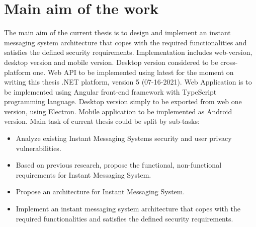 \chapter{Main aim of the work}\label{ch:main-aim-of-the-work}

The main aim of the current thesis is to design and implement an instant messaging system architecture that copes with the required functionalities and
satisfies the defined security requirements.
Implementation includes web-version, desktop version and mobile version.
Desktop version considered to be cross-platform one.
Web API to be implemented using latest for the moment on writing this thesis .NET platform, version 5 (07-16-2021).
Web Application is to be implemented using Angular front-end framework with TypeScript programming language.
Desktop version simply to be exported from web one version, using Electron.
Mobile application to be implemented as Android version.
Main task of current thesis could be split by sub-tasks:
\begin{itemize}
    \item Analyze existing Instant Messaging Systems security and user privacy vulnerabilities.
    \item Based on previous research, propose the functional, non-functional requirements for Instant Messaging System.
    \item Propose an architecture for Instant Messaging System.
    \item Implement an instant messaging system architecture that copes with the required functionalities and
    satisfies the defined security requirements.
\end{itemize}